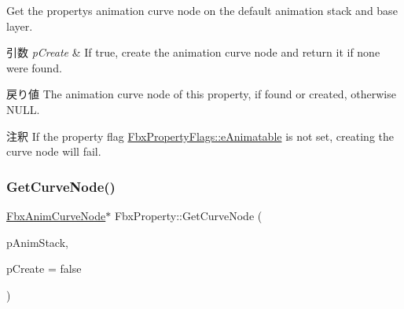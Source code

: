 Get the property\textquotesingle{}s animation curve node on the default animation stack and base layer. 
\begin{DoxyParams}{引数}
{\em p\+Create} & If {\ttfamily true}, create the animation curve node and return it if none were found. \\
\hline
\end{DoxyParams}
\begin{DoxyReturn}{戻り値}
The animation curve node of this property, if found or created, otherwise N\+U\+LL. 
\end{DoxyReturn}
\begin{DoxyRemark}{注釈}
If the property flag \hyperlink{class_fbx_property_flags_afabfa7e0949aac8a7dcdf8a141867e99ae2c562a65bb942f3f94631794bc3d257}{Fbx\+Property\+Flags\+::e\+Animatable} is not set, creating the curve node will fail. 
\end{DoxyRemark}
\mbox{\label{class_fbx_property_a7cbdcc1cccba29824790d0621911831d}} 
\subsubsection{\texorpdfstring{Get\+Curve\+Node()}{GetCurveNode()}\hspace{0.1cm}{\footnotesize\ttfamily [2/3]}}
{\footnotesize\ttfamily \hyperlink{class_fbx_anim_curve_node}{Fbx\+Anim\+Curve\+Node}$\ast$ Fbx\+Property\+::\+Get\+Curve\+Node (\begin{DoxyParamCaption}\item[{\hyperlink{class_fbx_anim_stack}{Fbx\+Anim\+Stack} $\ast$}]{p\+Anim\+Stack,  }\item[{bool}]{p\+Create = {\ttfamily false} }\end{DoxyParamCaption})}


